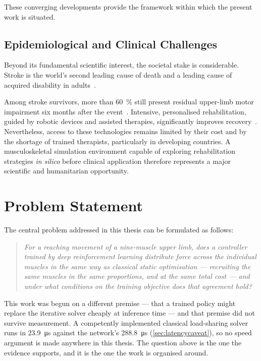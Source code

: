 These converging developments provide the framework within which the present work is
situated.

\subsection{Epidemiological and Clinical Challenges}
\label{sec:epidemio}

Beyond its fundamental scientific interest, the societal stake is considerable.
Stroke is the world's second leading cause of death and a leading cause of
acquired disability in adults~\parencite{Feigin2022}.

Among stroke survivors, more than $60$~\% still present residual upper-limb motor
impairment six months after the event~\parencite{Kwakkel2003}. Intensive,
personalised rehabilitation, guided by robotic devices and assisted therapies,
significantly improves recovery~\parencite{Lo2010}. Nevertheless, access to these
technologies remains limited by their cost and by the shortage of trained therapists,
particularly in developing countries. A musculoskeletal simulation environment capable
of exploring rehabilitation strategies \textit{in silico} before clinical application
therefore represents a major scientific and humanitarian opportunity.

\section{Problem Statement}

The central problem addressed in this thesis can be formulated as follows:

\begin{quote}
\itshape For a reaching movement of a nine-muscle upper limb, does a controller
trained by deep reinforcement learning distribute force across the individual
muscles in the same way as classical static optimisation --- recruiting the same
muscles in the same proportions, and at the same total cost --- and under what
conditions on the training objective does that agreement hold?
\end{quote}

This work was begun on a different premise --- that a trained policy might
replace the iterative solver cheaply at inference time --- and that premise did
not survive measurement. A competently implemented classical load-sharing solver
runs in \SI{23.9}{\micro\second} against the network's
\SI{288.8}{\micro\second} (\cref{sec:latencycaveat}), so no speed argument is
made anywhere in this thesis. The question above is the one the evidence
supports, and it is the one the work is organised around.

